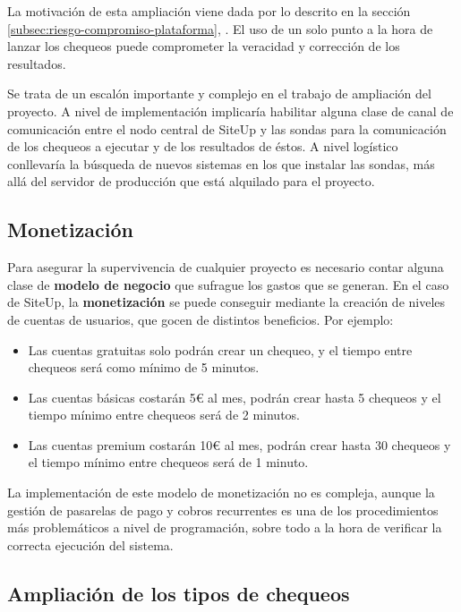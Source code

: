 La motivación de esta ampliación viene dada por lo descrito en la sección
\ref{subsec:riesgo-compromiso-plataforma},
\textit{}. El uso de un solo punto
a la hora de lanzar los chequeos puede comprometer la veracidad y corrección de
los resultados.

Se trata de un escalón importante y complejo en el trabajo de ampliación del
proyecto. A nivel de implementación implicaría habilitar alguna clase de canal
de comunicación entre el nodo central de SiteUp y las sondas para la
comunicación de los chequeos a ejecutar y de los resultados de éstos. A nivel
logístico conllevaría la búsqueda de nuevos sistemas en los que instalar las
sondas, más allá del servidor de producción que está alquilado para el proyecto.

\subsection{Monetización}

Para asegurar la supervivencia de cualquier proyecto es necesario contar alguna
clase de \textbf{modelo de negocio} que sufrague los gastos que se generan. En
el caso de SiteUp, la \textbf{monetización} se puede conseguir mediante la
creación de niveles de cuentas de usuarios, que gocen de distintos
beneficios. Por ejemplo:

\begin{itemize}
\item Las cuentas gratuitas solo podrán crear un chequeo, y el tiempo entre
  chequeos será como mínimo de 5 minutos.
\item Las cuentas básicas costarán 5€ al mes, podrán crear hasta 5 chequeos y el
  tiempo mínimo entre chequeos será de 2 minutos.
\item Las cuentas premium costarán 10€ al mes, podrán crear hasta 30 chequeos y
  el tiempo mínimo entre chequeos será de 1 minuto.
\end{itemize}

La implementación de este modelo de monetización no es compleja, aunque la
gestión de pasarelas de pago y cobros recurrentes es una de los procedimientos
más problemáticos a nivel de programación, sobre todo a la hora de verificar la
correcta ejecución del sistema. 

\subsection{Ampliación de los tipos de chequeos}

